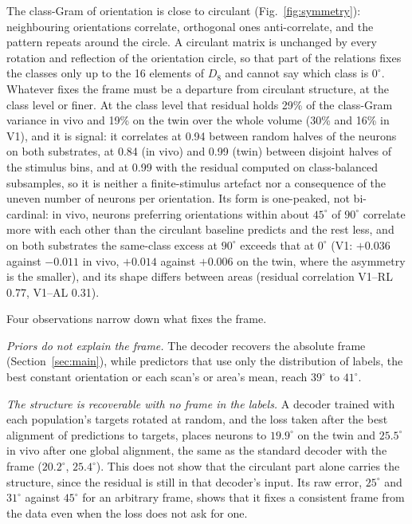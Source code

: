\documentclass[11pt]{article}
\begin{document}
The class-Gram of orientation is close to circulant (Fig.~\ref{fig:symmetry}): neighbouring orientations correlate, orthogonal ones anti-correlate, and the pattern repeats around the circle. A circulant matrix is unchanged by every rotation and reflection of the orientation circle, so that part of the relations fixes the classes only up to the 16 elements of $D_8$ and cannot say which class is $0^\circ$. Whatever fixes the frame must be a departure from circulant structure, at the class level or finer. At the class level that residual holds 29\% of the class-Gram variance in vivo and 19\% on the twin over the whole volume (30\% and 16\% in V1), and it is signal: it correlates at 0.94 between random halves of the neurons on both substrates, at 0.84 (in vivo) and 0.99 (twin) between disjoint halves of the stimulus bins, and at 0.99 with the residual computed on class-balanced subsamples, so it is neither a finite-stimulus artefact nor a consequence of the uneven number of neurons per orientation. Its form is one-peaked, not bi-cardinal: in vivo, neurons preferring orientations within about $45^\circ$ of $90^\circ$ correlate more with each other than the circulant baseline predicts and the rest less, and on both substrates the same-class excess at $90^\circ$ exceeds that at $0^\circ$ (V1: $+0.036$ against $-0.011$ in vivo, $+0.014$ against $+0.006$ on the twin, where the asymmetry is the smaller), and its shape differs between areas (residual correlation V1--RL 0.77, V1--AL 0.31).

Four observations narrow down what fixes the frame.

\emph{Priors do not explain the frame.} The decoder recovers the absolute frame (Section~\ref{sec:main}), while predictors that use only the distribution of labels, the best constant orientation or each scan's or area's mean, reach $39^\circ$ to $41^\circ$.

\emph{The structure is recoverable with no frame in the labels.} A decoder trained with each population's targets rotated at random, and the loss taken after the best alignment of predictions to targets, places neurons to $19.9^\circ$ on the twin and $25.5^\circ$ in vivo after one global alignment, the same as the standard decoder with the frame ($20.2^\circ$, $25.4^\circ$). This does not show that the circulant part alone carries the structure, since the residual is still in that decoder's input. Its raw error, $25^\circ$ and $31^\circ$ against $45^\circ$ for an arbitrary frame, shows that it fixes a consistent frame from the data even when the loss does not ask for one.
\end{document}
